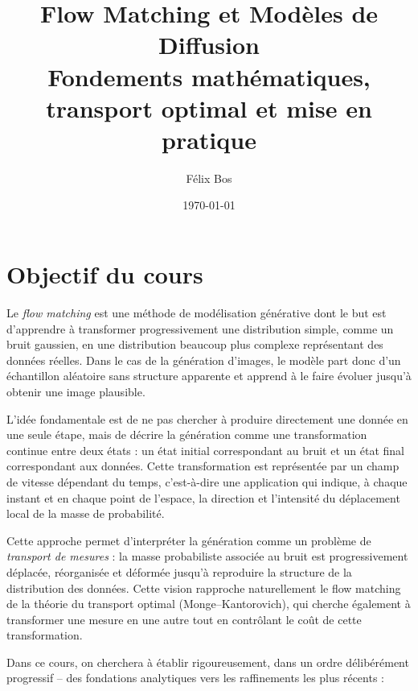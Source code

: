 \documentclass[11pt,a4paper]{article}
\title{\textbf{Flow Matching et Modèles de Diffusion}\\
\large Fondements mathématiques, transport optimal et mise en pratique}
\author{Félix Bos}
\date{\today}
\theoremstyle{definition}
\theoremstyle{plain}
\theoremstyle{remark}
\begin{document}
\maketitle
\tableofcontents
\newpage

\section{Objectif du cours}

Le \emph{flow matching} est une méthode de modélisation générative dont le but
est d'apprendre à transformer progressivement une distribution simple, comme un
bruit gaussien, en une distribution beaucoup plus complexe représentant des
données réelles. Dans le cas de la génération d'images, le modèle part donc d'un
échantillon aléatoire sans structure apparente et apprend à le faire évoluer
jusqu'à obtenir une image plausible.

L'idée fondamentale est de ne pas chercher à produire directement une donnée en
une seule étape, mais de décrire la génération comme une transformation continue
entre deux états : un état initial correspondant au bruit et un état final
correspondant aux données. Cette transformation est représentée par un champ de
vitesse dépendant du temps, c'est-à-dire une application qui indique, à chaque
instant et en chaque point de l'espace, la direction et l'intensité du
déplacement local de la masse de probabilité.

Cette approche permet d'interpréter la génération comme un problème de
\emph{transport de mesures} : la masse probabiliste associée au bruit est
progressivement déplacée, réorganisée et déformée jusqu'à reproduire la
structure de la distribution des données. Cette vision rapproche naturellement
le flow matching de la théorie du transport optimal (Monge--Kantorovich), qui
cherche également à transformer une mesure en une autre tout en contrôlant le
\og coût \fg{} de cette transformation.

Dans ce cours, on cherchera à établir rigoureusement, dans un ordre
délibérément progressif -- des fondations analytiques vers les raffinements les
plus récents :
\end{document}
